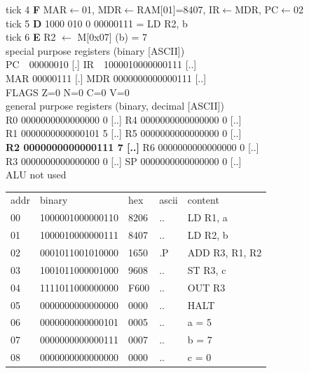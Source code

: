 \begin{tcolorbox}[stepbox, title={Instruction 1 \hfill ticks 1 to 3 \quad LD R1, a}]
\end{tcolorbox}\hfill\begin{tcolorbox}[stepbox, title={Instruction 2 \hfill ticks 4 to 6 \quad LD R2, b}]
\textcolor{dim}{tick 4} \textbf{F} MAR$\leftarrow$01, MDR$\leftarrow$RAM[01]=8407, IR$\leftarrow$MDR, PC$\leftarrow$02\\
\textcolor{dim}{tick 5} \textbf{D} 1000 010 0 00000111 = LD R2, b\\
\textcolor{dim}{tick 6} \textbf{E} R2 $\leftarrow$ M[0x07] (b) = 7\\[2pt]
\textcolor{dim}{special purpose registers (binary [ASCII])}\\
PC~~00000010 [.] \hfill IR~~1000010000000111 [..]\\
MAR 00000111 [.] \hfill MDR 0000000000000111 [..]\\
FLAGS Z=0 N=0 C=0 V=0\\[2pt]
\textcolor{dim}{general purpose registers (binary, decimal [ASCII])}\\
R0 0000000000000000 0 [..] \hfill R4 0000000000000000 0 [..]\\
R1 0000000000000101 5 [..] \hfill R5 0000000000000000 0 [..]\\
\textcolor{wrt}{\textbf{R2 0000000000000111 7 [..]}} \hfill R6 0000000000000000 0 [..]\\
R3 0000000000000000 0 [..] \hfill SP 0000000000000000 0 [..]\\
\textcolor{dim}{ALU not used}\\[2pt]
{\setlength{\tabcolsep}{2pt}\begin{tabular}{@{}lllll@{}}
\textcolor{dim}{addr} & \textcolor{dim}{binary} & \textcolor{dim}{hex} & \textcolor{dim}{ascii} & \textcolor{dim}{content}\\
00 & 1000001000000110 & 8206 & .. & LD R1, a\\
01 & 1000010000000111 & 8407 & .. & LD R2, b\\
\rowcolor{pcc}02 & 0001011001010000 & 1650 & .P & ADD R3, R1, R2\\
03 & 1001011000001000 & 9608 & .. & ST R3, c\\
04 & 1111011000000000 & F600 & .. & OUT R3\\
05 & 0000000000000000 & 0000 & .. & HALT\\
\rowcolor{datac}06 & 0000000000000101 & 0005 & .. & a = 5\\
\rowcolor{datac}07 & 0000000000000111 & 0007 & .. & b = 7\\
\rowcolor{datac}08 & 0000000000000000 & 0000 & .. & c = 0\\
\end{tabular}}
\end{tcolorbox}\par\vspace{3pt}
